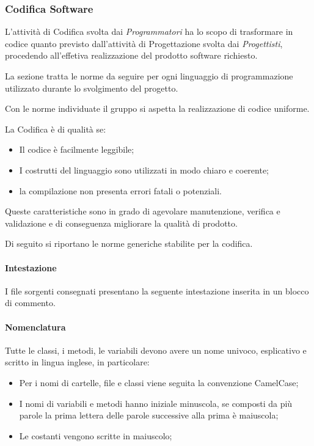 \subsubsection{Codifica Software}
L'attività di Codifica svolta dai \textit{Programmatori} ha lo scopo di trasformare in codice quanto previsto dall'attività di Progettazione svolta dai \textit{Progettisti}, procedendo all'effetiva realizzazione del prodotto software richiesto.

La sezione tratta le norme da seguire per ogni linguaggio di programmazione utilizzato durante lo svolgimento del progetto.

Con le norme individuate il gruppo si aspetta la realizzazione di codice uniforme.

La Codifica è di qualità se: 
\begin{itemize}
	\item Il codice è facilmente leggibile;
	\item I costrutti del linguaggio sono utilizzati in modo chiaro e coerente;
	\item la compilazione non presenta errori fatali o potenziali.
\end{itemize}
Queste caratteristiche sono in grado di agevolare manutenzione, verifica e validazione e di conseguenza migliorare la qualità di prodotto.

\label{CodificaConvenzioni}
Di seguito si riportano le norme generiche stabilite per la codifica.
\paragraph*{Intestazione}
I file sorgenti consegnati presentano la seguente intestazione inserita in un blocco di commento.
\paragraph*{Nomenclatura}
Tutte le classi, i metodi, le variabili devono avere un nome univoco, esplicativo e scritto in lingua inglese, in particolare:
\begin{itemize}
	\item Per i nomi di cartelle, file e classi viene seguita la convenzione CamelCase;
	\item I nomi di variabili e metodi hanno iniziale minuscola, se composti da più parole la prima lettera delle parole successive alla prima è maiuscola;
	\item Le costanti vengono scritte in maiuscolo;
\end{itemize}
